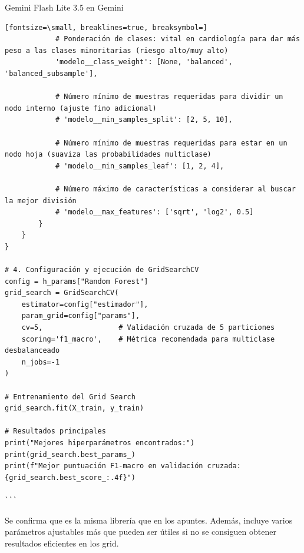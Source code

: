 \documentclass[12pt,a4paper,oneside]{book}
\begin{document}
\begin{iaresp}{Gemini Flash Lite 3.5 en Gemini}
\begin{Verbatim}[fontsize=\small, breaklines=true, breaksymbol=]
            # Ponderación de clases: vital en cardiología para dar más peso a las clases minoritarias (riesgo alto/muy alto)
            'modelo__class_weight': [None, 'balanced', 'balanced_subsample'],
            
            # Número mínimo de muestras requeridas para dividir un nodo interno (ajuste fino adicional)
            # 'modelo__min_samples_split': [2, 5, 10],
            
            # Número mínimo de muestras requeridas para estar en un nodo hoja (suaviza las probabilidades multiclase)
            # 'modelo__min_samples_leaf': [1, 2, 4],
            
            # Número máximo de características a considerar al buscar la mejor división
            # 'modelo__max_features': ['sqrt', 'log2', 0.5]
        }
    }
}

# 4. Configuración y ejecución de GridSearchCV
config = h_params["Random Forest"]
grid_search = GridSearchCV(
    estimator=config["estimador"],
    param_grid=config["params"],
    cv=5,                  # Validación cruzada de 5 particiones
    scoring='f1_macro',    # Métrica recomendada para multiclase desbalanceado
    n_jobs=-1
)

# Entrenamiento del Grid Search
grid_search.fit(X_train, y_train)

# Resultados principales
print("Mejores hiperparámetros encontrados:")
print(grid_search.best_params_)
print(f"Mejor puntuación F1-macro en validación cruzada: {grid_search.best_score_:.4f}")

```
\end{Verbatim}
\end{iaresp}
\begin{iaanalisis}
Se confirma que es la misma librería que en los apuntes. Además, incluye varios parámetros ajustables más que pueden ser útiles si no se consiguen obtener resultados eficientes en los grid.
\end{iaanalisis}
\end{document}
